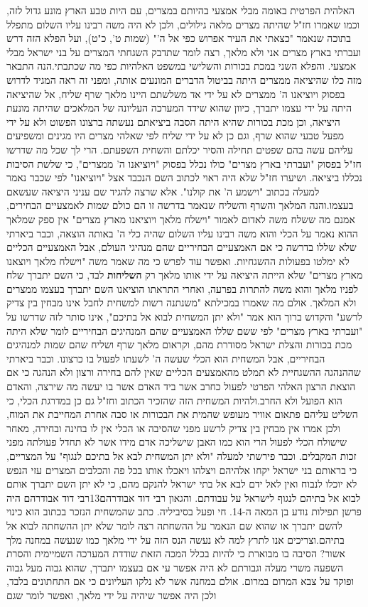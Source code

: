 \documentclass[12pt, openany]{book}
\begin{document}
האלהית הפרטית באומה מבלי אמצעי בהיותם במצרים, עם היות טבע הארץ מונע גדול לזה, וכמו שאמרו חז"ל שהיתה מצרים מלאה גילולים, ולכן לא היה משה רבינו עליו השלום מתפלל בתוכה שנאמר "כצאתי את העיר אפרוש כפי אל ה'" (שמות ט', כ"ט), ועל הפלא הזה דרש ועברתי בארץ מצרים אני ולא מלאך, רצה לומר שתדבק השגחתי המצרים על בני ישראל מבלי אמצעי. והפלא השני במכת בכורות והשלישי במשפט האלהיות כפי מה שכתבתי.הנה התבאר מזה כלו שהיציאה ממצרים היתה בביטול הדברים המונעים אותה, ומפני זה ראה המגיד לדרוש בפסוק ויוציאנו ה' ממצרים לא על ידי אד משלשתם היינו מלאך שרף שליח, אל שהיציאה היתה על ידי עצמו יתברך, כיוון שהוא שידד המערכה העליונה של המלאכים שהיתה מונעת היציאה, וכן מכת בכורות שהיא היתה הסבה ביציאתם נעשתה ברצונו הפשוט ולא על ידי מפעל טבעי שהוא שרף, וגם כן לא על ידי שליח לפי שאלהי מצרים היו מגינים ומשפיעים עליהם עשה בהם שפטים תחילה והסיר יכלתם והשחית השפעתם. הרי לך שכל מה שדרשו חז"ל בפסוק "ועברתי בארץ מצרים" כולו נכלל בפסוק "ויוציאנו ה' ממצרים", כי שלשת הסיבות נכללו ביציאה. ושיערו חז"ל שלא היה ראוי לכתוב השם הנכבד אצל "ויוציאנו" לפי שכבר נאמר למעלה בכתוב "וישמע ה' את קולנו". אלא שרצה להגיד שם עניני היציאה שעשאם בעצמו.והנה המלאך והשרף והשליח שנאמר בדרשה זו הם כולם שמות לאמצעיים הבחירים, אמנם מה ששלח משה לאדום לאמור "וישלח מלאך ויוציאנו מארץ מצרים" אין ספק שמלאך ההוא נאמר על הכלי והוא משה רבינו עליו השלום שהיה כלי ה' באותה הוצאה, וכבר ביארתי שלא שללו בדרשה כי אם האמצעיים הבחיריים שהם מנהיגי העולם, אבל האמצעיים הכליים לא ימלטו בפעולות ההשגחיות. ואפשר עוד לפרש כי מה שאמר משה "וישלח מלאך ויוצאנו מארץ מצרים" שלא הייתה היציאה על ידי אותו מלאך רק \textrm{\textbf{השליחות}} לבד, כי השם יתברך שלח לפניו מלאך והוא משה להתרות בפרעה, ואחרי התראתו הוציאנו השם יתברך בעצמו ממצרים ולא המלאך. אולם מה שאמרו במכילתא "משנתנה רשות למשחית לחבל אינו מבחין בין צדיק לרשע" והקדוש ברוך הוא אמר "ולא יתן המשחית לבוא אל בתיכם", אינו סותר לזה שדרשו על "ועברתי בארץ מצרים" לפי ששם שללו האמצעיים שהם המנהיגים הבחיריים לומר שלא היתה מכת בכורות והצלת ישראל מסודרת מהם, וקראום מלאך שרף ושליח שהם שמות למנהיגים הבחיריים, אבל המשחית הוא הכלי שעשה ה' לשעתו לפעול בו כרצונו. וכבר ביארתי שההנהגה ההשגחיית לא תמלט מהאמצעים הכליים שאין להם בחירה ורצון ולא הנהגה כי אם הוצאת הרצון האלהי הפרטי לפעול כחרב אשר ביד האדם אשר בו יעשה מה שירצה, והאדם הוא הפועל ולא החרב.ולהיות המשחית הזה שהזכיר הכתוב וחז"ל גם כן במדרגת הכלי, כי השליט עליהם פתאום אוויר מעופש שהמית את הבכורות או סבה אחרת המחייבת את המוח, ולכן אמרו אין מבחין בין צדיק לרשע מפני שהסיבה או הכלי אין לו בחינה ובחירה, מאחר שישולח הכלי לפעול הרי הוא כמו האבן שישליכה אדם מידו אשר לא תחדל פעולתה מפני זכות המקבלים. וכבר פירשתי למעלה "ולא יתן המשחית לבא אל בתיכם לנגוף" על המצריים, כי בראותם בני ישראל יקחו אלהיהם ויצלהו ויאכלו אותו בכל פה והכלבים המצרים עזי הנפש לא יוכלו לנבוח ואין לאל ידם לבא אל בתי ישראל להנקם מהם, כי לא יתן השם יתברך אותם לבוא אל בתיהם לנגוף לישראל על עבודתם. והגאון רבי דוד אבודרהם13רבי דוד אבודרהם היה פרשן תפילות נודע בן המאה ה-14. חי ופעל בסיביליה.  כתב שהמשחית הנזכר בכתוב הוא כינוי להשם יתברך או שהוא שם הנאמר על ההשחתה רצה לומר שלא יתן ההשחתה לבוא אל בתיהם.וצריכים אנו לתרץ למה לא נעשה הנס הזה על ידי מלאך כמו שנעשה במחנה מלך אשור? הסיבה בו מבוארת כי להיות בכלל המכה הזאת שודדת המערכה השמיימית והסרת השפעה משרי מעלה וגבורתם לא היה אפשר עי אם בעצמו יתברך, שהוא גבוה מעל גבוה ופוקד על צבא המרום במרום. אולם במחנה אשר לא נלקו העליונים כי אם התחתונים בלבד, ולכן היה אפשר שיהיה על ידי מלאך, ואפשר לומר שגם 
\end{document}
